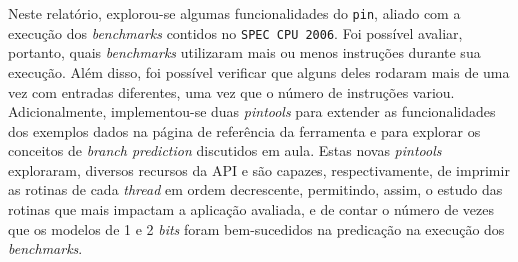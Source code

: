 \documentclass[12pt]{article}
\begin{document}
Neste relatório, explorou-se algumas funcionalidades do \texttt{pin}, aliado
com a execução dos \textit{benchmarks} contidos no \texttt{SPEC CPU 2006}. Foi
possível avaliar, portanto, quais \textit{benchmarks} utilizaram mais
ou menos instruções durante sua execução. Além disso, foi possível verificar
que alguns deles rodaram mais de uma vez com entradas diferentes, uma vez que o número de
instruções variou. Adicionalmente, implementou-se duas \textit{pintools} para
extender as funcionalidades dos exemplos dados na página de referência da ferramenta e para
explorar os conceitos de \textit{branch prediction} discutidos em aula.
Estas novas \textit{pintools} exploraram, diversos recursos da API e são
capazes, respectivamente, de imprimir as rotinas de cada \textit{thread} em ordem
decrescente, permitindo, assim, o estudo das rotinas que mais impactam a aplicação
avaliada, e de contar o número de vezes que os modelos de 1 e 2 \textit{bits}
foram bem-sucedidos na predicação na execução dos \textit{benchmarks}.




\end{document}

